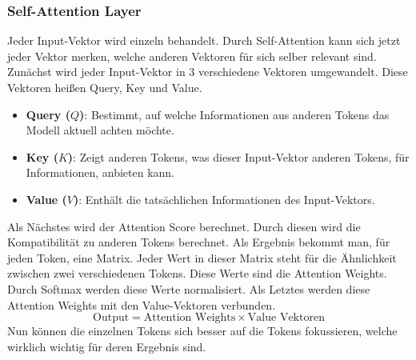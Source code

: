 \subsubsection{Self-Attention Layer}
Jeder Input-Vektor wird einzeln behandelt.
Durch Self-Attention kann sich jetzt jeder Vektor merken, welche anderen Vektoren für sich selber relevant sind.
Zunächst wird jeder Input-Vektor in 3 verschiedene Vektoren umgewandelt.
Diese Vektoren heißen Query, Key und Value.
\begin{itemize}
  \item \textbf{Query ($Q$)}: Bestimmt, auf welche Informationen aus anderen Tokens das Modell aktuell achten möchte.
  \item \textbf{Key ($K$)}: Zeigt anderen Tokens, was dieser Input-Vektor anderen Tokens, für Informationen, anbieten kann.
  \item \textbf{Value ($V$)}: Enthält die tatsächlichen Informationen des Input-Vektors.
\end{itemize}
Als Nächstes wird der Attention Score berechnet.
Durch diesen wird die Kompatibilität zu anderen Tokens berechnet.
Als Ergebnis bekommt man, für jeden Token, eine Matrix.
Jeder Wert in dieser Matrix steht für die Ähnlichkeit zwischen zwei verschiedenen Tokens.
Diese Werte sind die Attention Weights.
Durch Softmax werden diese Werte normalisiert.
Als Letztes werden diese Attention Weights mit den Value-Vektoren verbunden.
\[
\text{Output} = \text{Attention Weights} \times \text{Value Vektoren}
\]
Nun können die einzelnen Tokens sich besser auf die Tokens fokussieren, welche wirklich wichtig für deren Ergebnis sind.

